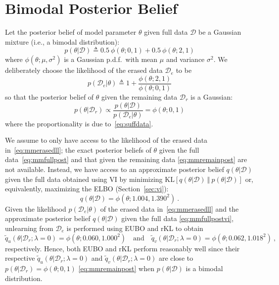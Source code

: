 \documentclass{article}
\theoremstyle{definition}
\newcommand{\mcl}[1]{\mathcal{#1}}
\newcommand{\da}{\mcl{D}}
\newcommand{\dc}{\mcl{D}_r}
\newcommand{\dr}{\mcl{D}_e}
\newcommand{\eubo}{\tilde{q}_u}
\newcommand{\elbo}{\tilde{q}_v}
\begin{document}
\section{Bimodal Posterior Belief}
\label{app:multimode}
%
Let the posterior belief of model parameter $\theta$ given full data $\da$ be a Gaussian mixture (i.e., a bimodal distribution): 
\begin{equation}
p(\theta|\da) \triangleq 0.5\ \phi(\theta; 0,1) + 0.5\ \phi(\theta; 2,1)
\label{eq:mmfullpost}
\end{equation}
%
where $\phi(\theta;\mu,\sigma^2)$ is a Gaussian p.d.f.~with mean $\mu$ and variance $\sigma^2$.
%
We deliberately choose the likelihood of the erased data $\dr$ to be
%
\begin{equation}
p(\dr|\theta) \triangleq 1 + \frac{\phi(\theta;2,1)}{\phi(\theta;0,1)}
\label{eq:mmerasedll}
\end{equation}
%
so that the posterior belief of $\theta$ given the remaining data $\dc$ is a Gaussian:
%
\begin{equation}
p(\theta|\dc) \propto \frac{p(\theta|\da)}{p(\dr|\theta)}
	= \phi(\theta; 0,1)
\label{eq:mmremainpost}
\end{equation}
%
where the proportionality is due to~\eqref{eq:suffdata}.

We assume to only have access to the likelihood of the erased data in~\eqref{eq:mmerasedll}; the exact posterior beliefs of $\theta$ given the full data~\eqref{eq:mmfullpost} and that given the remaining data \eqref{eq:mmremainpost} are not available. Instead, we have access to an approximate posterior belief $q(\theta|\da)$ given the full data obtained using VI by minimizing $\text{KL}[q(\theta|\da)\ \Vert\ p(\theta|\da)]$ or, equivalently, maximizing the ELBO (Section~\ref{sec:vi}):
%
\begin{equation}
q(\theta|\da) = \phi(\theta; 1.004, 1.390^2)\ .
\label{eq:mmfullpostvi}
\end{equation}
%
Given the likelihood $p(\dr|\theta)$ of the erased data in~\eqref{eq:mmerasedll} and the approximate posterior belief $q(\theta|\da)$ given the full data \eqref{eq:mmfullpostvi}, unlearning %
from $\dr$ is performed using EUBO and rKL to obtain
%
$$
\eubo(\theta| \dc; \lambda = 0) = \phi(\theta; 0.060, 1.000^2)\quad\text{and}\quad\elbo(\theta| \dc; \lambda = 0) = \phi(\theta; 0.062, 1.018^2)\ ,
$$
%
respectively. Hence, both EUBO and rKL perform reasonably well since their respective $\eubo(\theta| \dc; \lambda = 0)$ and $\elbo(\theta| \dc; \lambda = 0)$ are close to $p(\theta|\dc) = \phi(\theta;0,1)$ \eqref{eq:mmremainpost} when $p(\theta|\da)$ is a bimodal distribution.
%
\end{document}
